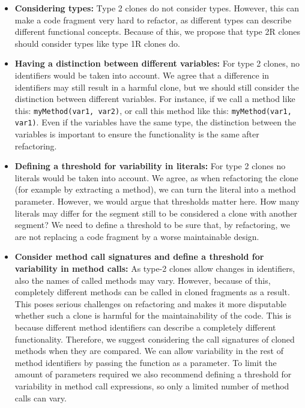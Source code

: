 \begin{itemize}
  \item \textbf{Considering types:} Type 2 clones do not consider types. However, this can make a code fragment very hard to refactor, as different types can describe different functional concepts. Because of this, we propose that type 2R clones should consider types like type 1R clones do.
  \item \textbf{Having a distinction between different variables:} For type 2 clones, no identifiers would be taken into account. We agree that a difference in identifiers may still result in a harmful clone, but we should still consider the distinction between different variables. For instance, if we call a method like this: \texttt{myMethod(var1, var2)}, or call this method like this: \texttt{myMethod(var1, var1)}. Even if the variables have the same type, the distinction between the variables is important to ensure the functionality is the same after refactoring.
  \item \textbf{Defining a threshold for variability in literals:} For type 2 clones no literals would be taken into account. We agree, as when refactoring the clone (for example by extracting a method), we can turn the literal into a method parameter. However, we would argue that thresholds matter here. How many literals may differ for the segment still to be considered a clone with another segment? We need to define a threshold to be sure that, by refactoring, we are not replacing a code fragment by a worse maintainable design.
  \item \textbf{Consider method call signatures and define a threshold for variability in method calls:} As type-2 clones allow changes in identifiers, also the names of called methods may vary. However, because of this, completely different methods can be called in cloned fragments as a result. This poses serious challenges on refactoring and makes it more disputable whether such a clone is harmful for the maintainability of the code. This is because different method identifiers can describe a completely different functionality. Therefore, we suggest considering the call signatures of cloned methods when they are compared. We can allow variability in the rest of method identifiers by passing the function as a parameter. To limit the amount of parameters required we also recommend defining a threshold for variability in method call expressions, so only a limited number of method calls can vary.
\end{itemize}

